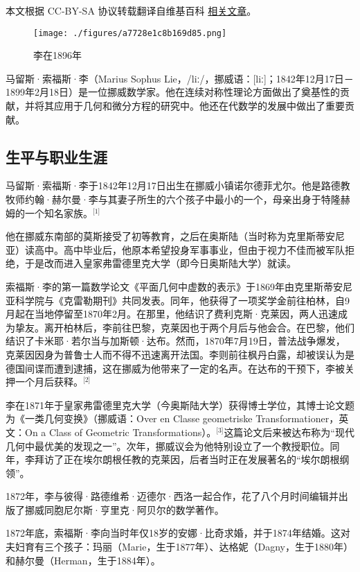 
本文根据 CC-BY-SA 协议转载翻译自维基百科 \href{https://en.wikipedia.org/wiki/Sophus_Lie}{相关文章}。

\begin{figure}[ht]
\centering
\texttt{[image: ./figures/a7728e1c8b169d85.png]}
\caption{李在1896年} \label{fig_SFSL_1}
\end{figure}
马留斯·索福斯·李（Marius Sophus Lie，/liː/，挪威语：[liː]；1842年12月17日－1899年2月18日）是一位挪威数学家。他在连续对称性理论方面做出了奠基性的贡献，并将其应用于几何和微分方程的研究中。他还在代数学的发展中做出了重要贡献。
\subsection{生平与职业生涯}
马留斯·索福斯·李于1842年12月17日出生在挪威小镇诺尔德菲尤尔。他是路德教牧师约翰·赫尔曼·李与其妻子所生的六个孩子中最小的一个，母亲出身于特隆赫姆的一个知名家族。\(^\text{[1]}\)

他在挪威东南部的莫斯接受了初等教育，之后在奥斯陆（当时称为克里斯蒂安尼亚）读高中。高中毕业后，他原本希望投身军事事业，但由于视力不佳而被军队拒绝，于是改而进入皇家弗雷德里克大学（即今日奥斯陆大学）就读。

索福斯·李的第一篇数学论文《平面几何中虚数的表示》于1869年由克里斯蒂安尼亚科学院与《克雷勒期刊》共同发表。同年，他获得了一项奖学金前往柏林，自9月起在当地停留至1870年2月。在那里，他结识了费利克斯·克莱因，两人迅速成为挚友。离开柏林后，李前往巴黎，克莱因也于两个月后与他会合。在巴黎，他们结识了卡米耶·若尔当与加斯顿·达布。然而，1870年7月19日，普法战争爆发，克莱因因身为普鲁士人而不得不迅速离开法国。李则前往枫丹白露，却被误认为是德国间谍而遭到逮捕，这在挪威为他带来了一定的名声。在达布的干预下，李被关押一个月后获释。\(^\text{[2]}\)

李在1871年于皇家弗雷德里克大学（今奥斯陆大学）获得博士学位，其博士论文题为《一类几何变换》（挪威语：Over en Classe geometriske Transformationer，英文：On a Class of Geometric Transformations）。\(^\text{[3]}\)这篇论文后来被达布称为“现代几何中最优美的发现之一”。次年，挪威议会为他特别设立了一个教授职位。同年，李拜访了正在埃尔朗根任教的克莱因，后者当时正在发展著名的“埃尔朗根纲领”。

1872年，李与彼得·路德维希·迈德尔·西洛一起合作，花了八个月时间编辑并出版了挪威同胞尼尔斯·亨里克·阿贝尔的数学著作。

1872年底，索福斯·李向当时年仅18岁的安娜·比奇求婚，并于1874年结婚。这对夫妇育有三个孩子：玛丽（Marie，生于1877年）、达格妮（Dagny，生于1880年）和赫尔曼（Herman，生于1884年）。

